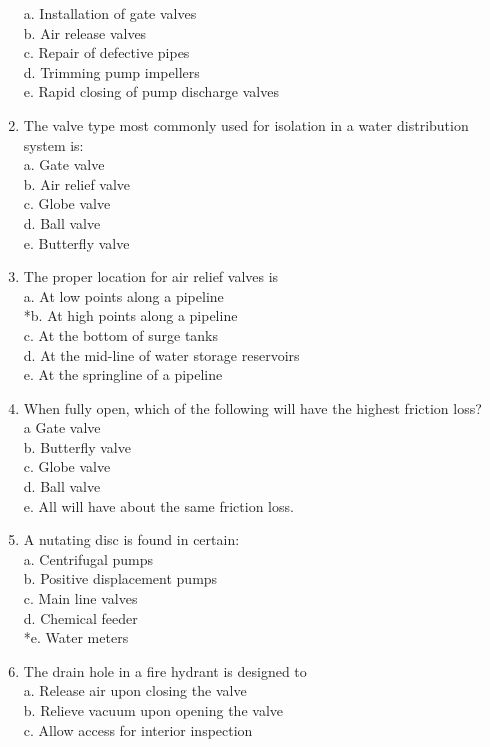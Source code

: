 \begin{enumerate}[1.]
a. Installation of gate valves\\
b. Air release valves\\
c. Repair of defective pipes\\
d. Trimming pump impellers\\
e. Rapid closing of pump discharge valves\\
\item The valve type most commonly used for isolation in a water distribution system is:\\
a. Gate valve\\
b. Air relief valve\\
c. Globe valve\\
d. Ball valve\\
e. Butterfly valve\\
\item The proper location for air relief valves is\\
a. At low points along a pipeline\\
*b. At high points along a pipeline\\
c. At the bottom of surge tanks\\
d. At the mid-line of water storage reservoirs\\
e. At the springline of a pipeline\\
\item When fully open, which of the following will have the highest friction loss?\\
a Gate valve\\
b. Butterfly valve\\
c. Globe valve\\
d. Ball valve\\
e. All will have about the same friction loss.\\
\item A nutating disc is found in certain:\\
a. Centrifugal pumps\\
b. Positive displacement pumps\\
c. Main line valves\\
d. Chemical feeder\\
*e. Water meters\\
\item The drain hole in a fire hydrant is designed to\\
a. Release air upon closing the valve\\
b. Relieve vacuum upon opening the valve\\
c. Allow access for interior inspection\\

\end{enumerate}
